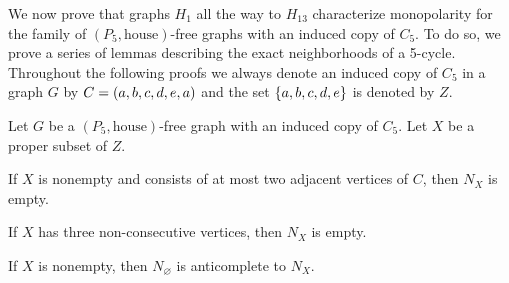 We now prove that graphs $H_1$ all the way to $H_{13}$ characterize monopolarity
for the family of $(P_5,\text{house})$-free graphs with an induced copy of
$C_5$. To do so, we prove a series of lemmas describing the exact neighborhoods
of a 5-cycle. Throughout the following proofs we always denote an induced copy
of $C_5$ in a graph $G$ by $C = \left(a,b,c,d,e,a\right)$ and the set $\left\{a,b,c,d,e\right\}$ is
denoted by $Z$.

\begin{lemma}
    \label{lem:pre_neighborhoods_c5}
    Let $G$ be a $(P_5,\text{house})$-free graph with an induced copy of $C_5$.
    Let $X$ be a proper subset of $Z$.
    \begin{lemenum}
        \item If $X$ is nonempty and consists of at most two adjacent vertices
            of $C$, then $N_X$ is empty. \label{lem:pre_c5_1}
        \item If $X$ has three non-consecutive vertices, then $N_X$ is empty.
            \label{lem:pre_c5_2}
        \item If $X$ is nonempty, then $N_\varnothing$ is anticomplete to $N_X$.
            \label{lem:pre_c5_3}
    \end{lemenum}
\end{lemma}

